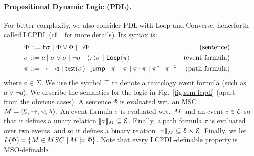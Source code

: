 \documentclass[a4paper,UKenglish,cleveref, autoref, thm-restate]{lipics-v2021}
\begin{document}
\paragraph*{Propositional Dynamic Logic (PDL).}

For better complexity, we also consider PDL with Loop and Converse, henceforth called LCPDL
(cf.\ \cite{DBLP:journals/corr/abs-1904-06942,BolligFG21,Streett81} for more details).
Its syntax is:
\begin{align*}
	&\Phi ::=  \textsf{E} \sigma \mid \Phi \vee \Phi \mid \neg \Phi &\text{(sentence)} \\
	&\sigma ::= a \mid \sigma \vee \sigma \mid \neg \sigma \mid \langle \pi \rangle \sigma \mid \textsf{Loop}\langle \pi \rangle &\text{(event formula)} \\
	&\pi ::= {\to} \mid {\lhd} \mid \textsf{test}(\sigma) \mid \textsf{jump} \mid \pi + \pi \mid \pi \cdot \pi \mid \pi^* \mid \pi^{-1} &\text{(path formula)}
\end{align*}
where $a \in \Sigma$.
We use the symbol $\top $ to denote a tautology event formula (such as $a \vee \neg a$).
We describe the semantics for the logic in Fig.~\ref{fig:sem-lcpdl} (apart from the obvious cases).
A sentence $\Phi$ is evaluated wrt. an MSC $M = (\mathcal{E}, \rightarrow, \lhd, \lambda)$.
An event formula $\sigma$ is
evaluated wrt.\ $M$ and an event $e \in \mathcal{E}$ so that it defines a unary relation $\llbracket \sigma \rrbracket_M \subseteq \mathcal{E}$. Finally, a path formula $\pi$ is evaluated over two events, and so it defines a binary relation $\llbracket \pi \rrbracket _M \subseteq \mathcal{E} \times \mathcal{E}$.
Finally, we let $L(\Phi) = \{\msc \in \MSCs \mid \msc \models \Phi\}$.
Note that every LCPDL-definable property is MSO-definable.
\end{document}

